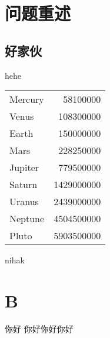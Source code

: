 \documentclass{ctexart}
\begin{document}
\section{问题重述}
\subsection{好家伙}\label{sec1}
hehe
\begin{center}
    \begin{tabular}{|l|r|}
        \hline
        Mercury & 58100000                   \\
        Venus   & 108300000                  \\
        Earth   & 150000000                  \\
        Mars    & 228250000                  \\
        Jupiter & 779500000                  \\
        Saturn  & 1429000000                 \\
        Uranus  & 2439000000                 \\
        Neptune & 4504500000                 \\
        Pluto   & 5903500000                 \\
        \hline
    \end{tabular}
\end{center}

nihak
\section{B}
你好 {\heiti{} 你好}{\fangsong 你好}{\songti 你好}
\end{document}
